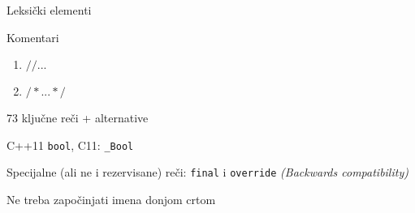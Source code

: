\documentclass{article}
\newenvironment{xitemize}{%
    
    \itemize
    \larger
}{%
    \enditemize
}
\let\olditemize\itemize
\let\endolditemize\enditemize
\renewenvironment{itemize}{%
    \smaller
    \olditemize
}{%
    \endolditemize
}
\providecommand{\inlinecode}[1]{\texttt{#1}}
\begin{document}
\begin{xitemize}
    \item Leksički elementi
    \begin{itemize}
        \item Komentari
        \begin{enumerate}
            \item \inlinecode{$//...$}
            \item \inlinecode{$/*...*/$}
        \end{enumerate}
        \item 73 ključne reči + alternative
        \item C++11 \inlinecode{bool}, C11:  \inlinecode{\_Bool}
        \item Specijalne (ali ne i rezervisane) reči: \inlinecode{final} i  \inlinecode{override} \textit{(Backwards compatibility)}
        \item Ne treba započinjati imena donjom crtom
    \end{itemize}


\end{xitemize}
\end{document}
